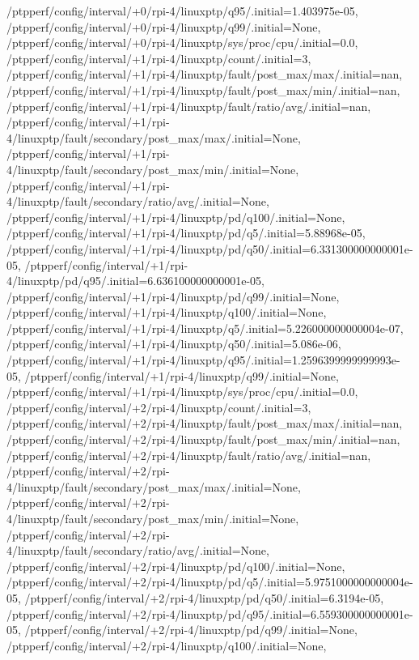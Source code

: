 {    /ptpperf/config/interval/+0/rpi-4/linuxptp/q95/.initial=1.403975e-05,
    /ptpperf/config/interval/+0/rpi-4/linuxptp/q99/.initial=None,
    /ptpperf/config/interval/+0/rpi-4/linuxptp/sys/proc/cpu/.initial=0.0,
    /ptpperf/config/interval/+1/rpi-4/linuxptp/count/.initial=3,
    /ptpperf/config/interval/+1/rpi-4/linuxptp/fault/post_max/max/.initial=nan,
    /ptpperf/config/interval/+1/rpi-4/linuxptp/fault/post_max/min/.initial=nan,
    /ptpperf/config/interval/+1/rpi-4/linuxptp/fault/ratio/avg/.initial=nan,
    /ptpperf/config/interval/+1/rpi-4/linuxptp/fault/secondary/post_max/max/.initial=None,
    /ptpperf/config/interval/+1/rpi-4/linuxptp/fault/secondary/post_max/min/.initial=None,
    /ptpperf/config/interval/+1/rpi-4/linuxptp/fault/secondary/ratio/avg/.initial=None,
    /ptpperf/config/interval/+1/rpi-4/linuxptp/pd/q100/.initial=None,
    /ptpperf/config/interval/+1/rpi-4/linuxptp/pd/q5/.initial=5.88968e-05,
    /ptpperf/config/interval/+1/rpi-4/linuxptp/pd/q50/.initial=6.331300000000001e-05,
    /ptpperf/config/interval/+1/rpi-4/linuxptp/pd/q95/.initial=6.636100000000001e-05,
    /ptpperf/config/interval/+1/rpi-4/linuxptp/pd/q99/.initial=None,
    /ptpperf/config/interval/+1/rpi-4/linuxptp/q100/.initial=None,
    /ptpperf/config/interval/+1/rpi-4/linuxptp/q5/.initial=5.226000000000004e-07,
    /ptpperf/config/interval/+1/rpi-4/linuxptp/q50/.initial=5.086e-06,
    /ptpperf/config/interval/+1/rpi-4/linuxptp/q95/.initial=1.2596399999999993e-05,
    /ptpperf/config/interval/+1/rpi-4/linuxptp/q99/.initial=None,
    /ptpperf/config/interval/+1/rpi-4/linuxptp/sys/proc/cpu/.initial=0.0,
    /ptpperf/config/interval/+2/rpi-4/linuxptp/count/.initial=3,
    /ptpperf/config/interval/+2/rpi-4/linuxptp/fault/post_max/max/.initial=nan,
    /ptpperf/config/interval/+2/rpi-4/linuxptp/fault/post_max/min/.initial=nan,
    /ptpperf/config/interval/+2/rpi-4/linuxptp/fault/ratio/avg/.initial=nan,
    /ptpperf/config/interval/+2/rpi-4/linuxptp/fault/secondary/post_max/max/.initial=None,
    /ptpperf/config/interval/+2/rpi-4/linuxptp/fault/secondary/post_max/min/.initial=None,
    /ptpperf/config/interval/+2/rpi-4/linuxptp/fault/secondary/ratio/avg/.initial=None,
    /ptpperf/config/interval/+2/rpi-4/linuxptp/pd/q100/.initial=None,
    /ptpperf/config/interval/+2/rpi-4/linuxptp/pd/q5/.initial=5.9751000000000004e-05,
    /ptpperf/config/interval/+2/rpi-4/linuxptp/pd/q50/.initial=6.3194e-05,
    /ptpperf/config/interval/+2/rpi-4/linuxptp/pd/q95/.initial=6.559300000000001e-05,
    /ptpperf/config/interval/+2/rpi-4/linuxptp/pd/q99/.initial=None,
    /ptpperf/config/interval/+2/rpi-4/linuxptp/q100/.initial=None,
}
